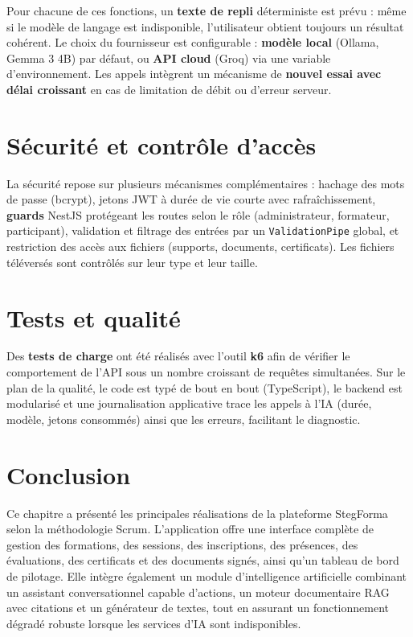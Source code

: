 \documentclass[12pt,a4paper,oneside,openany]{report}
\begin{document}
Pour chacune de ces fonctions, un \textbf{texte de repli} déterministe est prévu : même si le modèle de langage est indisponible, l'utilisateur obtient toujours un résultat cohérent. Le choix du fournisseur est configurable : \textbf{modèle local} (Ollama, Gemma 3 4B) par défaut, ou \textbf{API cloud} (Groq) via une variable d'environnement. Les appels intègrent un mécanisme de \textbf{nouvel essai avec délai croissant} en cas de limitation de débit ou d'erreur serveur.

\section{Sécurité et contrôle d'accès}

La sécurité repose sur plusieurs mécanismes complémentaires : hachage des mots de passe (bcrypt), jetons JWT à durée de vie courte avec rafraîchissement, \textbf{guards} NestJS protégeant les routes selon le rôle (administrateur, formateur, participant), validation et filtrage des entrées par un \texttt{ValidationPipe} global, et restriction des accès aux fichiers (supports, documents, certificats). Les fichiers téléversés sont contrôlés sur leur type et leur taille.

\section{Tests et qualité}

Des \textbf{tests de charge} ont été réalisés avec l'outil \textbf{k6} afin de vérifier le comportement de l'API sous un nombre croissant de requêtes simultanées. Sur le plan de la qualité, le code est typé de bout en bout (TypeScript), le backend est modularisé et une journalisation applicative trace les appels à l'IA (durée, modèle, jetons consommés) ainsi que les erreurs, facilitant le diagnostic.

\enlargethispage{2cm}

\section*{Conclusion}
\hrulefill

Ce chapitre a présenté les principales réalisations de la plateforme StegForma selon la méthodologie Scrum. L'application offre une interface complète de gestion des formations, des sessions, des inscriptions, des présences, des évaluations, des certificats et des documents signés, ainsi qu'un tableau de bord de pilotage. Elle intègre également un module d'intelligence artificielle combinant un assistant conversationnel capable d'actions, un moteur documentaire RAG avec citations et un générateur de textes, tout en assurant un fonctionnement dégradé robuste lorsque les services d'IA sont indisponibles.
\end{document}
